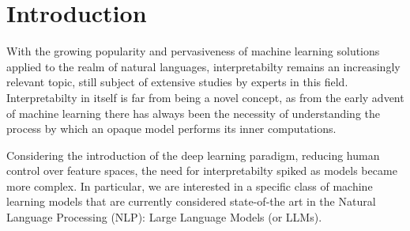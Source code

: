 \documentclass[11pt,a4paper,twocolumn]{article}
\begin{document}



\section{Introduction}\label{sec:introduction}

With the growing popularity and pervasiveness of machine learning solutions applied to the realm of natural languages, interpretabilty remains an increasingly relevant topic, still subject of extensive studies by experts in this field.
Interpretabilty in itself is far from being a novel concept, as from the early advent of machine learning there has always been the necessity of understanding the process by which an opaque model performs its inner computations.

Considering the introduction of the deep learning paradigm, reducing human control over feature spaces, the need for interpretabilty spiked as models became more complex.
In particular, we are interested in a specific class of machine learning models that are currently considered state-of-the art in the Natural Language Processing (NLP): Large Language Models (or LLMs).
\end{document}
